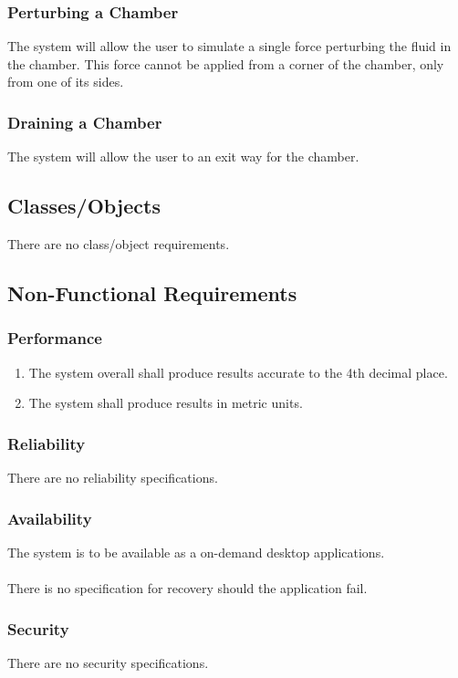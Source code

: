 \documentclass{scrartcl}
\begin{document}
\subsubsection{Perturbing a Chamber}
The system will allow the user to simulate a single  force perturbing the fluid in the chamber. This force cannot be applied from a corner of the chamber, only from one of its sides.

\subsubsection{Draining a Chamber}
The system will allow the user to an exit way for the chamber.


\subsection{Classes/Objects}
There are no class/object requirements. 



\subsection{Non-Functional Requirements}
\subsubsection{Performance}
\begin{enumerate}
\item The system overall shall produce results accurate to the 4th decimal place.

\item The system shall produce results in metric units.
\end{enumerate}
\subsubsection{Reliability}
There are no reliability specifications.

\subsubsection{Availability}
The system is to be available as a on-demand desktop applications.
\\\\
There is no specification for recovery should the application fail. 

\subsubsection{Security}
There are no security specifications. 
\end{document}
